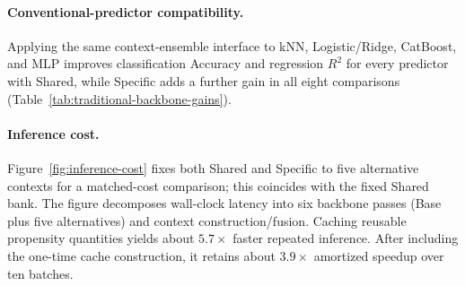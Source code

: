\paragraph{Conventional-predictor compatibility.}
Applying the same context-ensemble interface to kNN, Logistic/Ridge, CatBoost,
and MLP improves classification Accuracy and regression $R^2$ for every
predictor with Shared, while Specific adds a further gain in all eight
comparisons (Table~\ref{tab:traditional-backbone-gains}).

\paragraph{Inference cost.}
Figure~\ref{fig:inference-cost} fixes both Shared and Specific to five
alternative contexts for a matched-cost comparison; this coincides with the
fixed Shared bank. The figure decomposes wall-clock latency into six backbone
passes (Base plus five alternatives) and context construction/fusion. Caching
reusable propensity quantities yields about $5.7\times$ faster repeated
inference. After including the one-time cache construction, it retains about
$3.9\times$ amortized speedup over ten batches.

\FloatBarrier
